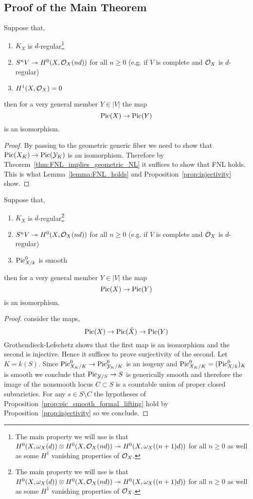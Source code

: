\documentclass[12pt]{article}
\begin{document}
\subsection{Proof of the Main Theorem}

\begin{theorem}[Version 1]
Suppose that,
\begin{enumerate}
\item $K_X$ is $d$-regular\footnote{The main property we will use is that $H^0(X, \omega_X(d)) \otimes H^0(X, \mathcal{O}_{X}(nd)) \twoheadrightarrow H^0(X, \omega_X((n+1)d))$ for all $n \ge 0$ as well as some $H^1$ vanishing properties of $\mathcal{O}_{X}$.}
\item $S^n V \twoheadrightarrow H^0(X, \mathcal{O}_{X}(nd))$ for all $n \ge 0$ (e.g. if $V$ is complete and $\mathcal{O}_{X}$ is $d$-regular)
\item $H^1(X, \mathcal{O}_{X}) = 0$
\end{enumerate}
then for a very general member $Y \in |V|$ the map
\[ \mathrm{Pic}(X) \to \mathrm{Pic}(Y) \]
is an isomorphism. 
\end{theorem}

\begin{proof}
By passing to the geometric generic fiber we need to show that $\mathrm{Pic}(X_K) \to \mathrm{Pic}(\mathcal{Y}_K)$ is an isomorphism. Therefore by Theorem~\ref{thm:FNL_implies_geometric_NL} it suffices to show that FNL holds. This is what Lemma~\ref{lemma:FNL_holds} and Proposition~\ref{prop:injectivity} show.
\end{proof}

\begin{theorem}[Version 2]
Suppose that,
\begin{enumerate}
\item $K_X$ is $d$-regular\footnote{The main property we will use is that $H^0(X, \omega_X(d)) \otimes H^0(X, \mathcal{O}_{X}(nd)) \twoheadrightarrow H^0(X, \omega_X((n+1)d))$ for all $n \ge 0$ as well as some $H^1$ vanishing properties of $\mathcal{O}_{X}$.}
\item $S^n V \twoheadrightarrow H^0(X, \mathcal{O}_{X}(nd))$ for all $n \ge 0$ (e.g. if $V$ is complete and $\mathcal{O}_{X}$ is $d$-regular)
\item $\mathrm{Pic}_{X/k}^0$ is smooth
\end{enumerate}
then for a very general member $Y \in |V|$ the map
\[ \mathrm{Pic}(X) \to \mathrm{Pic}(Y) \]
is an isomorphism. 
\end{theorem}

\begin{proof}
consider the maps,
\[ \mathrm{Pic}(X) \to \mathrm{Pic}(\hat{X}) \to \mathrm{Pic}(Y) \]
Grothendieck-Lefschetz shows that the first map is an isomorphism and the second is injective. Hence it suffices to prove surjectivity of the second.
Let $K = k(S)$. Since $\mathrm{Pic}_{X_K/K}^0 \to \mathrm{Pic}_{\mathcal{Y}_K/K}^0$ is an isogeny and $\mathrm{Pic}_{X_K/K}^0 = (\mathrm{Pic}_{X/k}^0)_K$ is smooth we conclude that $\mathrm{Pic}_{\mathcal{Y}/S} \to S$ is generically smooth and therefore the image of the nonsmooth locus $C \subset S$ is a countable union of proper closed subvarieties. For any $s \in S \setminus C$ the hypotheses of Proposition~\ref{prop:pic_smooth_formal_lifting} hold by Proposition~\ref{prop:injectivity} so we conclude.
\end{proof}
\end{document}
